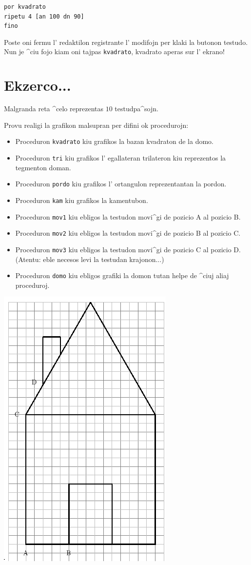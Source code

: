\begin{verbatim}
por kvadrato
ripetu 4 [an 100 dn 90]
fino
\end{verbatim}

Poste oni fermu l' redaktilon registrante l' modifojn per klaki la
butonon testudo.  Nun je ^ciu fojo kiam oni tajpas \texttt{kvadrato},
kvadrato aperas sur l' ekrano!

\section{Ekzerco...}
\noindent
Malgranda reta ^celo reprezentas $10$ testudpa^sojn.

Provu realigi la grafikon malsupran per difini ok procedurojn:
\begin{itemize}
\item Proceduron \og \texttt{kvadrato}\fg{} kiu grafikos la bazan
  kvadraton de la domo.
\item Proceduron \og \texttt{tri}\fg{} kiu grafikos l' egallateran
  trilateron kiu reprezentos la tegmenton doman.
\item Proceduron \og \texttt{pordo}\fg{} kiu grafikos l' ortangulon
  reprezentantan la pordon.
\item Proceduron \og \texttt{kam}\fg{} kiu grafikos la kamentubon.
\item Proceduron \og \texttt{mov1}\fg{} kiu ebligos la testudon
  movi^gi de pozicio A al pozicio B.
\item Proceduron \og \texttt{mov2}\fg{} kiu ebligos la testudon
  movi^gi de pozicio B al pozicio C.
\item Proceduron \og \texttt{mov3}\fg{} kiu ebligos la testudon
  movi^gi de pozicio C al pozicio D.  (Atentu: eble necesos levi la
  testudan krajonon...)
\item Proceduron \og \texttt{domo}\fg{} kiu ebligos grafiki la domon
  tutan helpe de ^ciuj aliaj proceduroj.
\end{itemize}
\label{maison}
\begin{center}
\includegraphics[scale=0.6]{bildoj/bases-maison.png}
\end{center}
